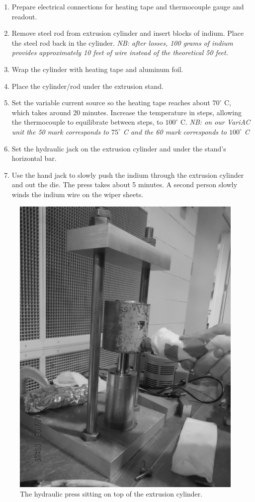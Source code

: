 \begin{enumerate}
\item Prepare electrical connections for heating tape and thermocouple gauge and readout.
\item Remove steel rod from extrusion cylinder and insert blocks of indium.  Place the steel rod back in the cylinder.  \textit{NB: after losses, 100 grams of indium provides approximately 10 feet of wire instead of the theoretical 50 feet.}
\item Wrap the cylinder with heating tape and aluminum foil.
\item Place the cylinder/rod under the extrusion stand.
\item Set the variable current source so the heating tape reaches about $70^\circ$ C, which takes around 20 minutes.  Increase the temperature in steps, allowing the thermocouple to equilibrate between steps, to $100 ^\circ$ C.  \textit{NB: on our VariAC unit the 50 mark corresponds to $75 ^\circ$ C and the 60 mark corresponds to $100^\circ$ C}
\item Set the hydraulic jack on the extrusion cylinder and under the stand's horizontal bar.
\item Use the hand jack to slowly push the indium through the extrusion cylinder and out the die.  The press takes about 5 minutes.  A second person slowly winds the indium wire on the wiper sheets. 
\end{enumerate}


\begin{figure}
 \centering
 \includegraphics[scale=0.75]{img/extruder-demo.png}
 \caption{The hydraulic press sitting on top of the extrusion cylinder.}
 \label{fig:extruder-demo}
\end{figure}


